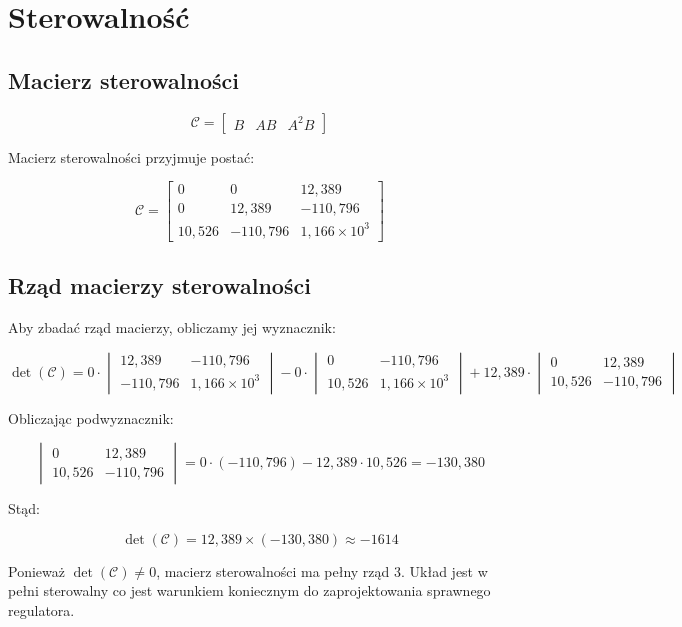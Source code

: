 \section{Sterowalność}

\subsection{Macierz sterowalności}

\begin{equation}
\mathcal{C} = \begin{bmatrix} B & AB & A^2 B \end{bmatrix}
\end{equation}

Macierz sterowalności przyjmuje postać:

\begin{equation}
\mathcal{C} = \begin{bmatrix} 0 & 0 & 12{,}389 \\ 0 & 12{,}389 & -110{,}796 \\ 10{,}526 & -110{,}796 & 1{,}166 \times 10^3 \end{bmatrix}
\end{equation}

\subsection{Rząd macierzy sterowalności}

Aby zbadać rząd macierzy, obliczamy jej wyznacznik:

\begin{equation}
\det(\mathcal{C}) = 0 \cdot \begin{vmatrix} 12{,}389 & -110{,}796 \\ -110{,}796 & 1{,}166 \times 10^3 \end{vmatrix} - 0 \cdot \begin{vmatrix} 0 & -110{,}796 \\ 10{,}526 & 1{,}166 \times 10^3 \end{vmatrix} + 12{,}389 \cdot \begin{vmatrix} 0 & 12{,}389 \\ 10{,}526 & -110{,}796 \end{vmatrix}
\end{equation}

Obliczając podwyznacznik:

\begin{equation}
\begin{vmatrix} 0 & 12{,}389 \\ 10{,}526 & -110{,}796 \end{vmatrix} = 0 \cdot (-110{,}796) - 12{,}389 \cdot 10{,}526 = -130{,}380
\end{equation}

Stąd:

\begin{equation}
\det(\mathcal{C}) = 12{,}389 \times (-130{,}380) \approx -1614
\end{equation}

Ponieważ $\det(\mathcal{C}) \neq 0$, macierz sterowalności ma pełny rząd 3. Układ jest w pełni sterowalny co jest warunkiem koniecznym do zaprojektowania sprawnego regulatora.
